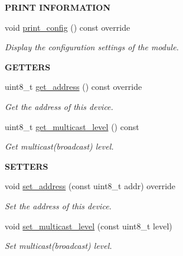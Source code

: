 \begin{Indent}{\bf P\+R\+I\+NT I\+N\+F\+O\+R\+M\+A\+T\+I\+ON}\par
\begin{DoxyCompactItemize}
\item 
void \hyperlink{class_loom__n_r_f_ad8a85a3ce2d9e2d7d12dec310a1c6615}{print\+\_\+config} () const override
\begin{DoxyCompactList}\small\item\em Display the configuration settings of the module. \end{DoxyCompactList}\end{DoxyCompactItemize}
\end{Indent}
\begin{Indent}{\bf G\+E\+T\+T\+E\+RS}\par
\begin{DoxyCompactItemize}
\item 
uint8\+\_\+t \hyperlink{class_loom__n_r_f_ae1140949b48b908ed1733fb8b3e7ae69}{get\+\_\+address} () const override
\begin{DoxyCompactList}\small\item\em Get the address of this device. \end{DoxyCompactList}\item 
uint8\+\_\+t \hyperlink{class_loom__n_r_f_a5ecdc813ddd9b32fa06a83147c922499}{get\+\_\+multicast\+\_\+level} () const 
\begin{DoxyCompactList}\small\item\em Get multicast(broadcast) level. \end{DoxyCompactList}\end{DoxyCompactItemize}
\end{Indent}
\begin{Indent}{\bf S\+E\+T\+T\+E\+RS}\par
\begin{DoxyCompactItemize}
\item 
void \hyperlink{class_loom__n_r_f_ab1020ef07ac5be037991ae48a5a6b682}{set\+\_\+address} (const uint8\+\_\+t addr) override
\begin{DoxyCompactList}\small\item\em Set the address of this device. \end{DoxyCompactList}\item 
void \hyperlink{class_loom__n_r_f_a7220c2a2c7f9ba87dfef36474b7fb34a}{set\+\_\+multicast\+\_\+level} (const uint8\+\_\+t level)
\begin{DoxyCompactList}\small\item\em Set multicast(broadcast) level. \end{DoxyCompactList}\end{DoxyCompactItemize}
\end{Indent}
